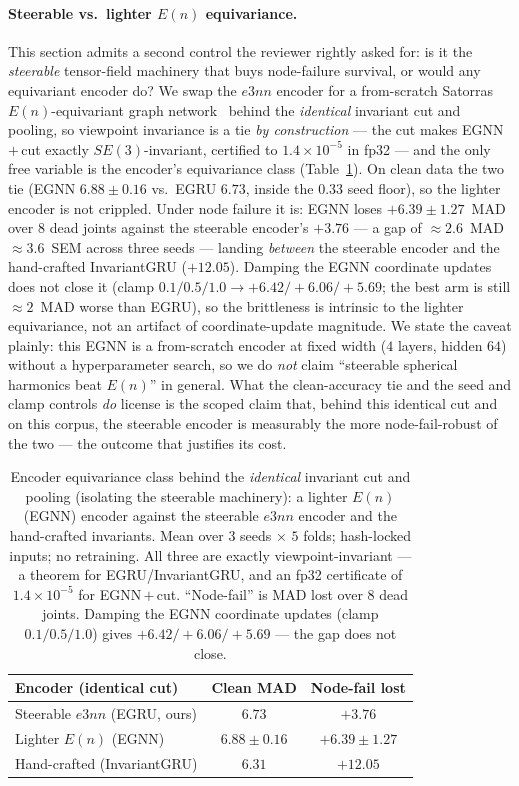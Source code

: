 \documentclass[10pt,journal]{IEEEtran}
\begin{document}
\paragraph{Steerable vs.\ lighter $E(n)$ equivariance.} This section admits a second control the
reviewer rightly asked for: is it the \emph{steerable} tensor-field machinery that buys node-failure
survival, or would any equivariant encoder do? We swap the $e3nn$ encoder for a from-scratch Satorras
$E(n)$-equivariant graph network~\cite{satorras2021egnn} behind the \emph{identical} invariant cut and
pooling, so viewpoint invariance is a tie \emph{by construction} --- the cut makes EGNN\,$+$\,cut
exactly $SE(3)$-invariant, certified to $1.4\times10^{-5}$ in fp32 --- and the only free variable is
the encoder's equivariance class (Table~\ref{tab:egnn}). On clean data the two tie (EGNN $6.88\pm0.16$
vs.\ EGRU $6.73$, inside the $0.33$ seed floor), so the lighter encoder is not crippled. Under node
failure it is: EGNN loses $+6.39\pm1.27$~MAD over $8$ dead joints against the steerable encoder's
$+3.76$ --- a gap of $\approx\!2.6$~MAD $\approx\!3.6$~SEM across three seeds --- landing \emph{between}
the steerable encoder and the hand-crafted InvariantGRU ($+12.05$). Damping the EGNN coordinate updates
does not close it (clamp $0.1/0.5/1.0 \to +6.42/+6.06/+5.69$; the best arm is still $\approx\!2$~MAD
worse than EGRU), so the brittleness is intrinsic to the lighter equivariance, not an artifact of
coordinate-update magnitude. We state the caveat plainly: this EGNN is a from-scratch encoder at fixed
width ($4$ layers, hidden $64$) without a hyperparameter search, so we do \emph{not} claim ``steerable
spherical harmonics beat $E(n)$'' in general. What the clean-accuracy tie and the seed and clamp
controls \emph{do} license is the scoped claim that, behind this identical cut and on this corpus, the
steerable encoder is measurably the more node-fail-robust of the two --- the outcome that justifies its
cost.

\begin{table}[!t]
\centering
\caption{Encoder equivariance class behind the \emph{identical} invariant cut and pooling (isolating
the steerable machinery): a lighter $E(n)$ (EGNN) encoder against the steerable $e3nn$ encoder and the
hand-crafted invariants. Mean over $3$ seeds $\times$ $5$ folds; hash-locked inputs; no retraining. All
three are exactly viewpoint-invariant --- a theorem for EGRU/InvariantGRU, and an fp32 certificate of
$1.4\times10^{-5}$ for EGNN\,$+$\,cut. ``Node-fail'' is MAD lost over $8$ dead joints. Damping the EGNN
coordinate updates (clamp $0.1/0.5/1.0$) gives $+6.42/+6.06/+5.69$ --- the gap does not close.}
\label{tab:egnn}
\small
\begin{tabular}{lcc}
\toprule
Encoder (identical cut) & Clean MAD & Node-fail lost \\
\midrule
Steerable $e3nn$ (EGRU, ours) & $6.73$          & $\mathbf{+3.76}$ \\
Lighter $E(n)$ (EGNN)         & $6.88 \pm 0.16$ & $+6.39 \pm 1.27$ \\
Hand-crafted (InvariantGRU)   & $6.31$          & $+12.05$ \\
\bottomrule
\end{tabular}
\end{table}
\end{document}
